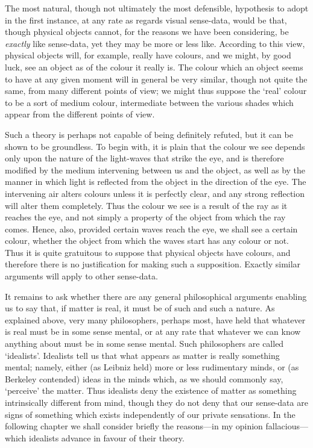 \documentclass[oneside,letterpaper,12pt]{book}
\begin{document}
The most natural, though not ultimately the most defensible, hypothesis
to adopt in the first instance, at any rate as regards visual
sense-data, would be that, though physical objects cannot, for the
reasons we have been considering, be \emph{exactly} like sense-data, yet
they may be more or less like. According to this view, physical objects
will, for example, really have colours, and we might, by good luck, see
an object as of the colour it really is. The colour which an object
seems to have at any given moment will in general be very similar,
though not quite the same, from many different points of view; we might
thus suppose the `real' colour to be a
sort of medium colour, intermediate between the various shades which
appear from the different points of view.

Such a theory is perhaps not capable of being definitely refuted, but it
can be shown to be groundless. To begin with, it is plain that the
colour we see depends only upon the nature of the light-waves that
strike the eye, and is therefore modified by the medium intervening
between us and the object, as well as by the manner in which light is
reflected from the object in the direction of the eye. The intervening
air alters colours unless it is perfectly clear, and any strong
reflection will alter them completely. Thus the colour we see is a
result of the ray as it reaches the eye, and not simply a property of
the object from which the ray comes. Hence, also, provided certain waves
reach the eye, we shall see a certain colour, whether the object from
which the waves start has any colour or not. Thus it is quite gratuitous
to suppose that physical objects have colours, and therefore there is no
justification for making such a supposition. Exactly similar arguments
will apply to other sense-data.

It remains to ask whether there are any general philosophical arguments
enabling us to say that, if matter is real, it must be of such and such
a nature. As explained above, very many philosophers, perhaps most, have
held that whatever is real must be in some sense mental, or at any rate
that whatever we can know anything about must be in some sense mental.
Such philosophers are called `idealists'.
Idealists tell us that what appears as matter is really something
mental; namely, either (as Leibniz held) more or less rudimentary minds,
or (as Berkeley contended) ideas in the minds which, as we should
commonly say, `perceive' the matter.
Thus idealists deny the existence of matter as something intrinsically
different from mind, though they do not deny that our sense-data are
signs of something which exists independently of our private sensations.
In the following chapter we shall consider briefly the reasons---in my
opinion fallacious---which idealists advance in favour of their theory.
\end{document}
